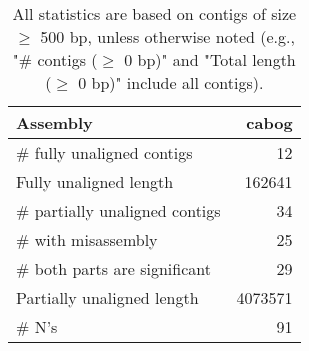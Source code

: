 \documentclass[12pt,a4paper]{article}
\begin{document}
\begin{table}[ht]
\begin{center}
\caption{All statistics are based on contigs of size $\geq$ 500 bp, unless otherwise noted (e.g., "\# contigs ($\geq$ 0 bp)" and "Total length ($\geq$ 0 bp)" include all contigs).}
\begin{tabular}{|l*{1}{|r}|}
\hline
Assembly & cabog \\ \hline
\# fully unaligned contigs & 12 \\ \hline
Fully unaligned length & 162641 \\ \hline
\# partially unaligned contigs & 34 \\ \hline
\hspace{5mm}\# with misassembly & 25 \\ \hline
\hspace{5mm}\# both parts are significant & 29 \\ \hline
Partially unaligned length & 4073571 \\ \hline
\# N's & 91 \\ \hline
\end{tabular}
\end{center}
\end{table}
\end{document}

